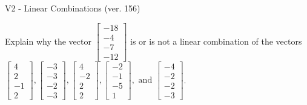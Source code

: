 \begin{exercise}
  \begin{exerciseTitle}V2 - Linear Combinations (ver. 156)\end{exerciseTitle}
  \begin{exerciseStatement}
    Explain why the vector \(\left[\begin{array}{c}
-18 \\
-4 \\
-7 \\
-12
\end{array}\right]\)  is or is not a linear 
	combination of the vectors \(\left[\begin{array}{c}
4 \\
2 \\
-1 \\
2
\end{array}\right] , \left[\begin{array}{c}
-3 \\
-3 \\
-2 \\
-3
\end{array}\right] , \left[\begin{array}{c}
4 \\
-2 \\
2 \\
2
\end{array}\right] , \left[\begin{array}{c}
-2 \\
-1 \\
-5 \\
1
\end{array}\right] , \text{ and } \left[\begin{array}{c}
-4 \\
-2 \\
-2 \\
-3
\end{array}\right]\).
	



\end{exerciseStatement}
\end{exercise}
